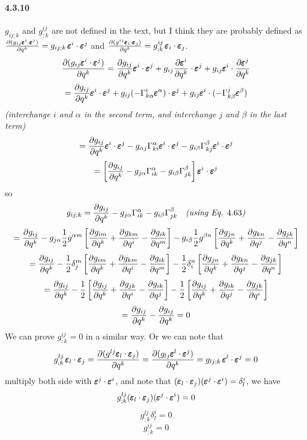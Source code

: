 \documentclass[a4paper]{article}
\begin{document}
\paragraph{4.3.10}
$g_{ij;k}$ and $g^{ij}_{;k}$ are not defined in the text, but I think they are probably defined as \\$\pdv{(g_{ij}\EE^i\cdot\EE^j)}{q^k}=g_{ij;k}\,\EE^i\cdot\EE^j$ and $\pdv{(g^{ij}\EE_i\cdot\EE_j)}{q^k}=g^{ij}_{;k}\,\EE_i\cdot\EE_j$. 
\[
\pdv{(g_{ij}\EE^i\cdot\EE^j)}{q^k}=\pdv{g_{ij}}{q^k}\EE^i\cdot\EE^j+g_{ij}\pdv{\EE^i}{q^k}\cdot\EE^j+g_{ij}\EE^i\cdot\pdv{\EE^j}{q^k}
\]
\[
=\pdv{g_{ij}}{q^k}\EE^i\cdot\EE^j+g_{ij}(-\Gamma^i_{k\alpha}\EE^\alpha)\cdot\EE^j+g_{ij}\EE^i\cdot(-\Gamma^j_{k\beta}\EE^\beta)
\]
\textit{(interchange $i$ and $\alpha$ in the second term, and interchange $j$ and $\beta$ in the last term)}
\[
=\pdv{g_{ij}}{q^k}\EE^i\cdot\EE^j-g_{\alpha j}\Gamma^\alpha_{ki}\EE^i\cdot\EE^j-g_{i\beta}\Gamma^\beta_{kj}\EE^i\cdot\EE^j
\]
\[
=\left[\pdv{g_{ij}}{q^k}-g_{j\alpha }\Gamma^\alpha_{ik}-g_{i\beta}\Gamma^\beta_{jk}\right]\EE^i\cdot\EE^j
\]
so 
\[
g_{ij;k}=\pdv{g_{ij}}{q^k}-g_{j\alpha }\Gamma^\alpha_{ik}-g_{i\beta}\Gamma^\beta_{jk}\quad\textit{(using Eq. $4.63$)}
\]
\[
=\pdv{g_{ij}}{q^k}-g_{j\alpha}\frac{1}{2}g^{\alpha m}\left[\pdv{g_{im}}{q^k}+\pdv{g_{km}}{q^i}-\pdv{g_{ik}}{q^m} \right]-g_{i\beta}\frac{1}{2}g^{\beta n}\left[\pdv{g_{jn}}{q^k}+\pdv{g_{kn}}{q^j}-\pdv{g_{jk}}{q^n} \right]
\]
\[
=\pdv{g_{ij}}{q^k}-\frac{1}{2}\delta^m_j\left[\pdv{g_{im}}{q^k}+\pdv{g_{km}}{q^i}-\pdv{g_{ik}}{q^m} \right]-\frac{1}{2}\delta^n_i\left[\pdv{g_{jn}}{q^k}+\pdv{g_{kn}}{q^j}-\pdv{g_{jk}}{q^n} \right]
\]
\[
=\pdv{g_{ij}}{q^k}-\frac{1}{2}\left[\pdv{g_{ij}}{q^k}+\pdv{g_{jk}}{q^i}-\pdv{g_{ik}}{q^j} \right]-\frac{1}{2}\left[\pdv{g_{ij}}{q^k}+\pdv{g_{ik}}{q^j}-\pdv{g_{jk}}{q^i} \right]
\]
\[
=\pdv{g_{ij}}{q^k}-\pdv{g_{ij}}{q^k}=0
\]
We can prove $g^{ij}_{;k}=0$ in a similar way. Or we can note that \[g^{lj}_{;k}\,\EE_l\cdot\EE_j=\pdv{(g^{lj}\EE_l\cdot\EE_j)}{q^k}=\pdv{(g_{lj}\EE^l\cdot\EE^j)}{q^k}=g_{lj;k}\,\EE^l\cdot\EE^j=0\]
multiply both side with $\EE^j\cdot\EE^i$, and note that $(\EE_l\cdot\EE_j)(\EE^j\cdot\EE^i)=\delta^i_l$, we have
\[
g^{lj}_{;k}(\EE_l\cdot\EE_j)(\EE^j\cdot\EE^i)=0\]
\[g^{lj}_{;k}\delta^i_l=0\]
\[g^{ij}_{;k}=0
\]
\end{document}
